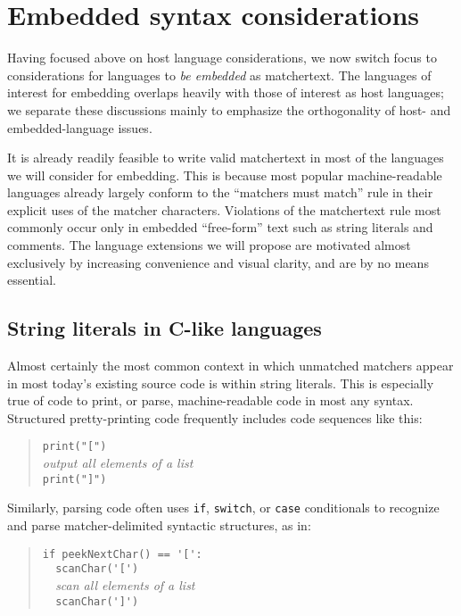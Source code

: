 \section{Embedded syntax considerations}
\label{sec:embed}

Having focused above on host language considerations,
we now switch focus to considerations for languages
to \emph{be embedded} as matchertext.
The languages of interest for embedding
overlaps heavily with those of interest as host languages;
we separate these discussions mainly to emphasize the orthogonality
of host- and embedded-language issues.

It is already readily feasible to write valid matchertext
in most of the languages we will consider for embedding.
This is because most popular machine-readable languages
already largely conform to the ``matchers must match'' rule
in their explicit uses of the matcher characters.
Violations of the matchertext rule most commonly occur
only in embedded ``free-form'' text such as string literals and comments.
The language extensions we will propose are motivated almost exclusively
by increasing convenience and visual clarity,
and are by no means essential.

\subsection{String literals in C-like languages}

Almost certainly the most common context in which unmatched matchers
appear in most today's existing source code is within string literals.
This is especially true of code to print, or parse,
machine-readable code in most any syntax.
Structured pretty-printing code frequently includes code sequences like this:

\begin{quote}
\verb|print("[")| \\
\emph{output all elements of a list} \\
\verb|print("]")|
\end{quote}

Similarly, parsing code often uses \verb|if|, \verb|switch|,
or \verb|case| conditionals
to recognize and parse matcher-delimited syntactic structures,
as in:

\begin{quote}
\verb|if peekNextChar() == '[':| \\
\verb|  scanChar('[')| \\
\verb|  |\emph{scan all elements of a list} \\
\verb|  scanChar(']')| 
\end{quote}

